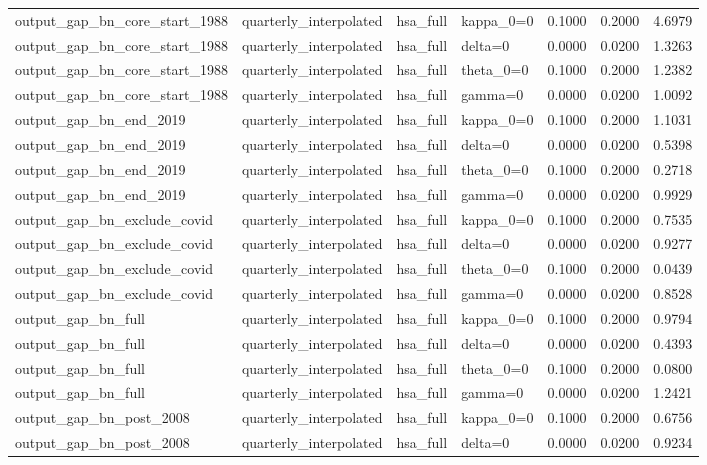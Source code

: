 \begin{tabular}{llllrrr}
output\_gap\_bn\_core\_start\_1988 & quarterly\_interpolated & hsa\_full & kappa\_0=0 & 0.1000 & 0.2000 & 4.6979 \\
output\_gap\_bn\_core\_start\_1988 & quarterly\_interpolated & hsa\_full & delta=0 & 0.0000 & 0.0200 & 1.3263 \\
output\_gap\_bn\_core\_start\_1988 & quarterly\_interpolated & hsa\_full & theta\_0=0 & 0.1000 & 0.2000 & 1.2382 \\
output\_gap\_bn\_core\_start\_1988 & quarterly\_interpolated & hsa\_full & gamma=0 & 0.0000 & 0.0200 & 1.0092 \\
output\_gap\_bn\_end\_2019 & quarterly\_interpolated & hsa\_full & kappa\_0=0 & 0.1000 & 0.2000 & 1.1031 \\
output\_gap\_bn\_end\_2019 & quarterly\_interpolated & hsa\_full & delta=0 & 0.0000 & 0.0200 & 0.5398 \\
output\_gap\_bn\_end\_2019 & quarterly\_interpolated & hsa\_full & theta\_0=0 & 0.1000 & 0.2000 & 0.2718 \\
output\_gap\_bn\_end\_2019 & quarterly\_interpolated & hsa\_full & gamma=0 & 0.0000 & 0.0200 & 0.9929 \\
output\_gap\_bn\_exclude\_covid & quarterly\_interpolated & hsa\_full & kappa\_0=0 & 0.1000 & 0.2000 & 0.7535 \\
output\_gap\_bn\_exclude\_covid & quarterly\_interpolated & hsa\_full & delta=0 & 0.0000 & 0.0200 & 0.9277 \\
output\_gap\_bn\_exclude\_covid & quarterly\_interpolated & hsa\_full & theta\_0=0 & 0.1000 & 0.2000 & 0.0439 \\
output\_gap\_bn\_exclude\_covid & quarterly\_interpolated & hsa\_full & gamma=0 & 0.0000 & 0.0200 & 0.8528 \\
output\_gap\_bn\_full & quarterly\_interpolated & hsa\_full & kappa\_0=0 & 0.1000 & 0.2000 & 0.9794 \\
output\_gap\_bn\_full & quarterly\_interpolated & hsa\_full & delta=0 & 0.0000 & 0.0200 & 0.4393 \\
output\_gap\_bn\_full & quarterly\_interpolated & hsa\_full & theta\_0=0 & 0.1000 & 0.2000 & 0.0800 \\
output\_gap\_bn\_full & quarterly\_interpolated & hsa\_full & gamma=0 & 0.0000 & 0.0200 & 1.2421 \\
output\_gap\_bn\_post\_2008 & quarterly\_interpolated & hsa\_full & kappa\_0=0 & 0.1000 & 0.2000 & 0.6756 \\
output\_gap\_bn\_post\_2008 & quarterly\_interpolated & hsa\_full & delta=0 & 0.0000 & 0.0200 & 0.9234 \\

\end{tabular}
